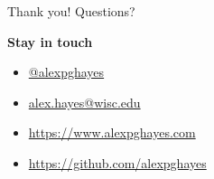 \documentclass[aspectratio=169]{beamer}
\theoremstyle{remark}
\begin{document}
\begin{frame}{Thank you! Questions?}
    
    \textbf{Stay in touch}
    
    \begin{itemize}
        \item[]  \href{https://twitter.com/alexpghayes}{@alexpghayes}
        \item[]  \href{mailto:alex.hayes@wisc.edu}{alex.hayes@wisc.edu}
        \item[]  \url{https://www.alexpghayes.com}
        \item[]  \url{https://github.com/alexpghayes}
    \end{itemize}
    
\end{frame}

\appendix



\end{document}
